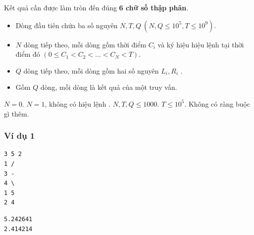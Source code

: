Kết quả cần được làm tròn đến đúng \textbf{6 chữ số thập phân}.


\begin{itemize}
    \item Dòng đầu tiên chứa ba số nguyên $N, T, Q\ (N, Q \le 10^5, T \le 10^9)$.  
    \item $N$ dòng tiếp theo, mỗi dòng gồm thời điểm $C_i$ và ký hiệu hiệu lệnh tại thời điểm đó $(0 \le C_1 < C_2 < \dots < C_N < T)$.  
    \item $Q$ dòng tiếp theo, mỗi dòng gồm hai số nguyên $L_i, R_i$ .
\end{itemize}

\begin{itemize}
    \item Gồm $Q$ dòng, mỗi dòng là kết quả của một truy vấn.
\end{itemize}

\begin{makesubtasks}
     $N = 0$.  
     $N = 1$, không có hiệu lệnh \fbox{\texttt{-}}.  
     $N, T, Q \le 1000$.  
     $T \le 10^5$.  
     Không có ràng buộc gì thêm.
\end{makesubtasks}


\subsubsection*{Ví dụ 1}
\begin{makesample}
\begin{lstlisting}
3 5 2
1 /
3 -
4 \
1 5
2 4
\end{lstlisting}
\nextsample
\begin{lstlisting}
5.242641
2.414214
\end{lstlisting}
\end{makesample}

